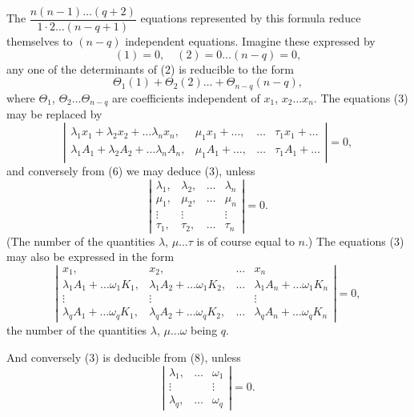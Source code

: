 \documentclass[11pt,a4paper]{book}
\begin{document}
The $\dfrac{n(n-1) \ldots (q+2)}{1 \cdot 2 \ldots (n-q+1)}$ equations represented by this formula reduce themselves to
$(n-q)$ independent equations. Imagine these expressed by
\[
(1) = 0, \quad (2) = 0 \ldots (n-q) = 0 \tag{4},
\]
any one of the determinants of (2) is reducible to the form
\[
\Theta_1(1) + \Theta_2(2) \ldots + \Theta_{n-q}(n-q) \tag{5},
\]
where $\Theta_1$, $\Theta_2 \ldots \Theta_{n-q}$ are coefficients independent of $x_1$, $x_2 \ldots x_n$.
The equations (3) may be replaced by
\[
\left|
\begin{array}{cccc}
\lambda_1 x_1 + \lambda_2 x_2 + \ldots \lambda_n x_n, & \mu_1 x_1 + \ldots, & \ldots & \tau_1 x_1 + \ldots \\
\lambda_1 A_1 + \lambda_2 A_2 + \ldots \lambda_n A_n, & \mu_1 A_1 + \ldots, & \ldots & \tau_1 A_1 + \ldots
\end{array}
\right| = 0
\tag{6},
\]
and conversely from (6) we may deduce (3), unless
\[
\left|
\begin{array}{cccc}
\lambda_1, & \lambda_2, & \ldots & \lambda_n \\
\mu_1, & \mu_2, & \ldots & \mu_n \\
\vdots & \vdots & & \vdots \\
\tau_1, & \tau_2, & \ldots & \tau_n
\end{array}
\right| = 0
\tag{7}.
\]
(The number of the quantities $\lambda$, $\mu \ldots \tau$ is of course equal to $n$.)
The equations (3) may also be expressed in the form
\[
\left|
\begin{array}{cccc}
x_1, & x_2, & \ldots & x_n \\
\lambda_1 A_1 + \ldots \omega_1 K_1, & \lambda_1 A_2 + \ldots \omega_1 K_2, & \ldots & \lambda_1 A_n + \ldots \omega_1 K_n \\
\vdots & \vdots & & \vdots \\
\lambda_q A_1 + \ldots \omega_q K_1, & \lambda_q A_2 + \ldots \omega_q K_2, & \ldots & \lambda_q A_n + \ldots \omega_q K_n
\end{array}
\right| = 0
\tag{8},
\]
the number of the quantities $\lambda$, $\mu \ldots \omega$ being $q$.

And conversely (3) is deducible from (8), unless
\[
\left|
\begin{array}{cccc}
\lambda_1, & \ldots & \omega_1 \\
\vdots & & \vdots \\
\lambda_q, & \ldots & \omega_q
\end{array}
\right| = 0
\tag{9}.
\]
\end{document}

